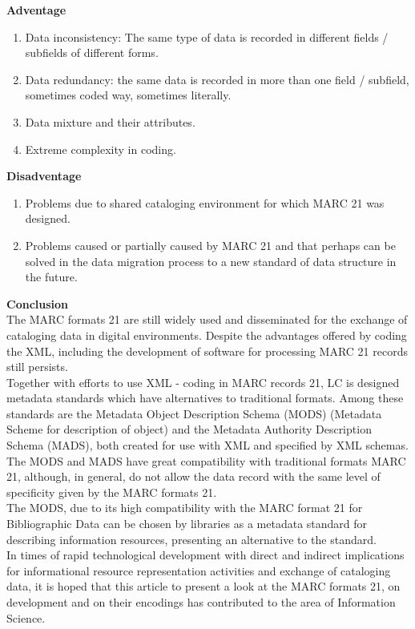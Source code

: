 \begin{enumerate}
	{\bf Adventage}
	\begin{enumerate}
		\item Data inconsistency: The same type of data is recorded in different fields / subfields of different forms.
		\item Data redundancy: the same data is recorded in more than one field / subfield, sometimes coded way, sometimes literally.	
		\item Data mixture and their attributes.
		\item Extreme complexity in coding.
	\end{enumerate}	
	{\bf Disadventage}
	\begin{enumerate}
		\item Problems due to shared cataloging environment for which MARC 21 was designed.
		\item Problems caused or partially caused by MARC 21 and that perhaps can be solved in the data migration process to a new standard of data structure in the future.
	\end{enumerate}
	{\bf Conclusion}\\
	The MARC formats 21 are still widely used and disseminated for the exchange of cataloging data in digital environments. Despite the advantages offered by coding the XML, including the development of software for processing MARC 21 records still persists.\\
	Together with efforts to use XML - coding in MARC records 21, LC is designed metadata standards which have alternatives to traditional formats. Among these standards are the Metadata Object Description Schema (MODS) (Metadata Scheme for description of object) and the Metadata Authority Description Schema (MADS), both created for use with XML and specified by XML schemas.\\
	The MODS and MADS have great compatibility with traditional formats MARC 21, although, in general, do not allow the data record with the same level of specificity given by the MARC formats 21.\\
	The MODS, due to its high compatibility with the MARC format 21 for Bibliographic Data can be chosen by libraries as a metadata standard for describing information resources, presenting an alternative to the standard. \\
	In times of rapid technological development with direct and indirect implications for informational resource representation activities and exchange of cataloging data, it is hoped that this article to present a look at the MARC formats 21, on development and on their encodings has contributed to the area of Information Science.
	

\end{enumerate}
